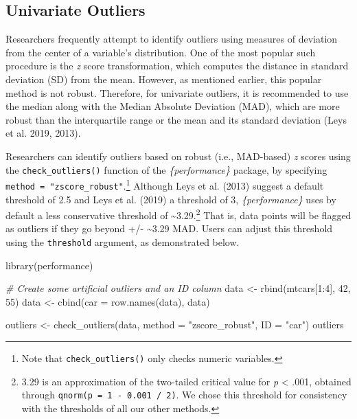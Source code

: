\documentclass{article}
\newenvironment{Shaded}{\begin{snugshade}}{\end{snugshade}}
\newcommand{\AttributeTok}[1]{\textcolor[rgb]{0.77,0.63,0.00}{#1}}
\newcommand{\CommentTok}[1]{\textcolor[rgb]{0.56,0.35,0.01}{\textit{#1}}}
\newcommand{\DecValTok}[1]{\textcolor[rgb]{0.00,0.00,0.81}{#1}}
\newcommand{\FunctionTok}[1]{\textcolor[rgb]{0.00,0.00,0.00}{#1}}
\newcommand{\NormalTok}[1]{#1}
\newcommand{\OtherTok}[1]{\textcolor[rgb]{0.56,0.35,0.01}{#1}}
\newcommand{\SpecialCharTok}[1]{\textcolor[rgb]{0.00,0.00,0.00}{#1}}
\newcommand{\StringTok}[1]{\textcolor[rgb]{0.31,0.60,0.02}{#1}}
\begin{document}
\hypertarget{univariate-outliers}{%
\subsection{Univariate Outliers}\label{univariate-outliers}}

Researchers frequently attempt to identify outliers using measures of
deviation from the center of a variable's distribution. One of the most
popular such procedure is the \emph{z} score transformation, which
computes the distance in standard deviation (SD) from the mean. However,
as mentioned earlier, this popular method is not robust. Therefore, for
univariate outliers, it is recommended to use the median along with the
Median Absolute Deviation (MAD), which are more robust than the
interquartile range or the mean and its standard deviation (Leys et al.
2019, 2013).

Researchers can identify outliers based on robust (i.e., MAD-based)
\emph{z} scores using the \texttt{check\_outliers()} function of the
\emph{\{performance\}} package, by specifying
\texttt{method\ =\ "zscore\_robust"}.\footnote{Note that
  \texttt{check\_outliers()} only checks numeric variables.} Although
Leys et al. (2013) suggest a default threshold of 2.5 and Leys et al.
(2019) a threshold of 3, \emph{\{performance\}} uses by default a less
conservative threshold of \textasciitilde3.29.\footnote{3.29 is an
  approximation of the two-tailed critical value for \emph{p}
  \textless{} .001, obtained through
  \texttt{qnorm(p\ =\ 1\ -\ 0.001\ /\ 2)}. We chose this threshold for
  consistency with the thresholds of all our other methods.} That is,
data points will be flagged as outliers if they go beyond +/-
\textasciitilde3.29 MAD. Users can adjust this threshold using the
\texttt{threshold} argument, as demonstrated below.

\begin{Shaded}
\begin{Highlighting}[]
\FunctionTok{library}\NormalTok{(performance)}

\CommentTok{\# Create some artificial outliers and an ID column}
\NormalTok{data }\OtherTok{\textless{}{-}} \FunctionTok{rbind}\NormalTok{(mtcars[}\DecValTok{1}\SpecialCharTok{:}\DecValTok{4}\NormalTok{], }\DecValTok{42}\NormalTok{, }\DecValTok{55}\NormalTok{)}
\NormalTok{data }\OtherTok{\textless{}{-}} \FunctionTok{cbind}\NormalTok{(}\AttributeTok{car =} \FunctionTok{row.names}\NormalTok{(data), data)}

\NormalTok{outliers }\OtherTok{\textless{}{-}} \FunctionTok{check\_outliers}\NormalTok{(data, }\AttributeTok{method =} \StringTok{"zscore\_robust"}\NormalTok{, }\AttributeTok{ID =} \StringTok{"car"}\NormalTok{)}
\NormalTok{outliers}
\end{Highlighting}
\end{Shaded}
\end{document}
